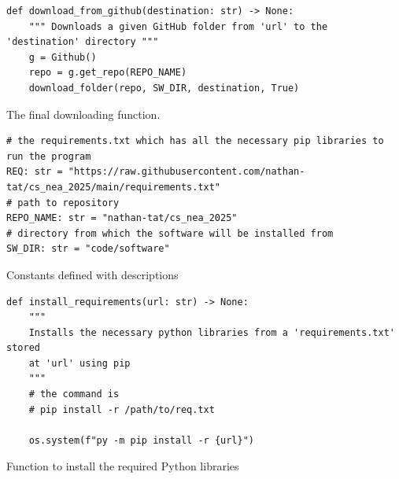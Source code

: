 \documentclass[11pt]{article}
\begin{document}
        \newpage
        \begin{listing}[!ht]
            \begin{verbatim}
def download_from_github(destination: str) -> None:
    """ Downloads a given GitHub folder from 'url' to the 'destination' directory """
    g = Github()
    repo = g.get_repo(REPO_NAME)
    download_folder(repo, SW_DIR, destination, True)
            \end{verbatim}
            \caption{The final downloading function.}
            \label{sc:final_dl_func_c1}
        \end{listing}


        \newpage
        \begin{listing}[!ht]
            \begin{verbatim}
# the requirements.txt which has all the necessary pip libraries to run the program 
REQ: str = "https://raw.githubusercontent.com/nathan-tat/cs_nea_2025/main/requirements.txt"
# path to repository
REPO_NAME: str = "nathan-tat/cs_nea_2025"
# directory from which the software will be installed from 
SW_DIR: str = "code/software"
            \end{verbatim}
            \caption{Constants defined with descriptions}
            \label{sc:consts_install_c1}
        \end{listing}


        \newpage
        \begin{listing}[!ht]
            \begin{verbatim}
def install_requirements(url: str) -> None:
    """ 
    Installs the necessary python libraries from a 'requirements.txt' stored  
    at 'url' using pip
    """
    # the command is 
    # pip install -r /path/to/req.txt
    
    os.system(f"py -m pip install -r {url}")
            \end{verbatim}
            \caption{Function to install the required Python libraries}
            \label{sc:install_reqs_fail1_c1}
        \end{listing}
\end{document}
